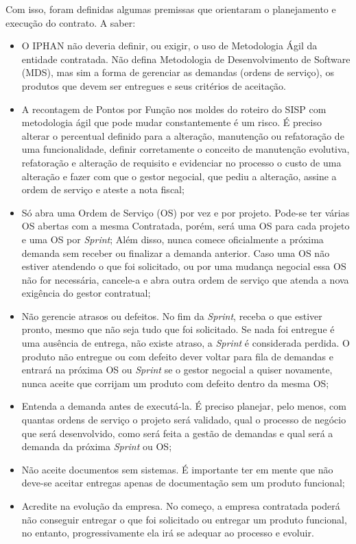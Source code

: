 Com isso, foram definidas algumas premissas que orientaram o planejamento e execução do contrato. A saber: 
\begin{itemize}
\item O IPHAN não deveria definir, ou exigir, o uso de Metodologia Ágil da entidade contratada. Não defina Metodologia de Desenvolvimento de Software (MDS), mas sim a
forma de gerenciar as demandas (ordens de serviço), os produtos que devem ser entregues e seus critérios de aceitação. 
\item A recontagem de Pontos por Função nos moldes do roteiro do SISP com metodologia ágil que pode mudar constantemente é um risco. É preciso alterar o percentual definido para a alteração, manutenção ou refatoração de uma funcionalidade, definir corretamente o conceito de manutenção evolutiva, refatoração e alteração de requisito e evidenciar no processo o custo de uma alteração e fazer com que o gestor negocial, que pediu a alteração, assine a ordem de serviço e ateste a nota fiscal;
\item Só abra uma Ordem de Serviço (OS) por vez e por projeto. Pode-se ter várias OS abertas com a mesma Contratada, porém, será uma OS para cada projeto e uma OS por \textit{Sprint}; Além disso, nunca comece oficialmente a próxima demanda sem receber ou finalizar a demanda anterior. Caso uma OS não estiver atendendo o que foi solicitado, ou por uma mudança negocial essa OS não for necessária, cancele-a e abra outra ordem de serviço que atenda a nova exigência do gestor contratual;
\item Não gerencie atrasos ou defeitos. No fim da \textit{Sprint}, receba o que estiver pronto, mesmo que não seja tudo que foi solicitado. Se nada foi entregue é uma ausência de entrega, não existe atraso, a \textit{Sprint} é considerada perdida. O produto não entregue ou com defeito dever voltar para fila de demandas e entrará na próxima OS ou \textit{Sprint} se o gestor negocial a quiser novamente, nunca aceite que corrijam um produto com defeito dentro da mesma OS;
\item Entenda a demanda antes de executá-la. É preciso planejar, pelo menos, com quantas ordens de serviço o projeto será validado, qual o processo de negócio que será desenvolvido, como será feita a gestão de demandas e qual será a demanda da próxima \textit{Sprint} ou OS;
\item Não aceite documentos sem sistemas. É importante ter em mente que não deve-se aceitar entregas apenas de documentação sem um produto funcional;
\item Acredite na evolução da empresa. No começo, a empresa contratada poderá não conseguir entregar o que foi solicitado ou entregar um produto funcional, no entanto, progressivamente ela irá se adequar ao processo e evoluir. 
\end{itemize} 

